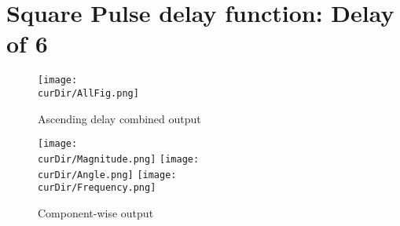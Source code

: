 \newpage
\newcommand{\curDir}{PMUsim-figures/Square/DelayOf_6}
\section{Square Pulse delay function: Delay of 6}
\begin{figure}[hb]
    \texttt{[image: \\curDir/AllFig.png]}    
    \caption{Ascending delay combined output}
    \label{fig:PMUsim-Sqa6-allfig}
\end{figure}


     \begin{figure}
        \caption{Component-wise output}
 
    \texttt{[image: \\curDir/Magnitude.png]}    
         \label{fig:PMUsim-Sqa6Mag}
   \texttt{[image: \\curDir/Angle.png]}    
         \label{fig:PMUsim-Sqa6Ang}
   \texttt{[image: \\curDir/Frequency.png]}    
         \label{fig:PMUsim-Sqa6Freq}
 
\end{figure}


